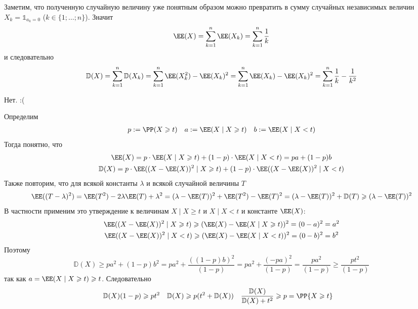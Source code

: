 \documentclass[12pt,a4paper]{article}
\newcommand{\DD}{\ensuremath{\mathbb{D}}\xspace}
\begin{document}
\begin{enumproblem}
        Заметим, что полученную случайную величину уже понятным образом можно превратить в сумму случайных независимых величин $X_k = \mathds{1}_{a_k = 0}$ ($k \in \{1; \dots; n\}$). Значит
        \[\EE(X) = \sum_{k=1}^n \EE(X_k) = \sum_{k=1}^n \frac{1}{k}\]
        и следовательно
        \[\DD(X) = \sum_{k=1}^n \DD(X_k) = \sum_{k=1}^n \EE(X_k^2) - \EE(X_k)^2 = \sum_{k=1}^n \EE(X_k) - \EE(X_k)^2 = \sum_{k=1}^n \frac{1}{k} - \frac{1}{k^2}\]
    \end{enumproblem}

    \begin{enumproblem}
        Нет. :(
    \end{enumproblem}

    \begin{enumproblem}
        Определим
        \begin{align*}
            &p := \PP(X \geqslant t)
            &a := \EE(X \mid X \geqslant t)&
            &b := \EE(X \mid X < t)
        \end{align*}
        Тогда понятно, что
        \begin{gather*}
            \EE(X) = p \cdot \EE(X \mid X \geqslant t) + (1-p) \cdot \EE(X \mid X < t) = pa + (1-p)b\\
            \DD(X) = p \cdot \EE((X - \EE(X))^2 \mid X \geqslant t) + (1-p) \cdot \EE((X - \EE(X))^2 \mid X < t)
        \end{gather*}
        Также повторим, что для всякой константы $\lambda$ и всякой случайной величины $T$
        \[
            \EE((T - \lambda)^2)
            = \EE(T^2) - 2\lambda \EE(T) + \lambda^2
            = (\lambda - \EE(T))^2 + \EE(T^2) - \EE(T)^2
            = (\lambda - \EE(T))^2 + \DD(T)
            \geqslant (\lambda - \EE(T))^2
        \]
        В частности применим это утверждение к величинам $X \mid X \geqslant t$ и $X \mid X < t$ и константе $\EE(X)$:
        \begin{gather*}
            \EE((X - \EE(X))^2 \mid X \geqslant t) \geqslant (\EE(X) - \EE(X \mid X \geqslant t))^2 = (0 - a)^2 = a^2\\
            \EE((X - \EE(X))^2 \mid X < t) \geqslant (\EE(X) - \EE(X \mid X < t))^2 = (0 - b)^2 = b^2
        \end{gather*}
        Поэтому
        \[
            \DD(X)
            \geqslant p a^2 + (1-p) b^2
            = p a^2 + \frac{((1-p)b)^2}{(1-p)}
            = p a^2 + \frac{(-pa)^2}{(1-p)}
            = \frac{pa^2}{(1-p)}
            \geqslant \frac{pt^2}{(1-p)}
        \]
        так как $a = \EE(X \mid X \geqslant t) \geqslant t$. Следовательно
        \begin{align*}
            \DD(X) (1-p) &\geqslant p t^2&
            \DD(X) &\geqslant p (t^2 + \DD(X))&
            \frac{\DD(X)}{\DD(X) + t^2} &\geqslant p = \PP\{X \geqslant t\}&
        \end{align*}
    \end{enumproblem}
\end{document}
